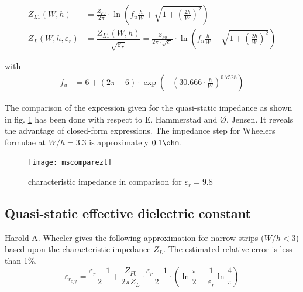 \documentclass[10pt]{report}
\begin{document}
\begin{align}
\label{eq:HandJZL0}
Z_{L1}\left(W, h\right) &=
\frac{Z_{F0}}{2\pi}\cdot\ln{\left(f_{u}\frac{h}{W} + \sqrt{1 + \left(\frac{2h}{W}\right)^{2}}\right)}\\
Z_{L}\left(W, h, \varepsilon_{r}\right) &= \dfrac{Z_{L1} \left(W, h\right)}{\sqrt{\varepsilon_{r}}} = \frac{Z_{F0}}{2\pi\cdot\sqrt{\varepsilon_{r}}}\cdot\ln{\left(f_{u}\frac{h}{W} + \sqrt{1 + \left(\frac{2h}{W}\right)^{2}}\right)}
\end{align}

with
\begin{align}
f_{u} &= 6 + \left(2\pi - 6\right)\cdot\exp{\left(-\left(30.666\cdot\frac{h}{W}\right)^{0.7528}\right)}
\end{align}

The comparison of the expression given for the quasi-static impedance
as shown in fig. \ref{fig:mscomparezl} has been done with respect to
E. Hammerstad and {\O}. Jensen.  It reveals the advantage of closed-form
expressions.  The impedance step for Wheelers formulae at $W/h = 3.3$
is approximately $0.1\ohm$.

\begin{figure}[ht]
\begin{center}
\texttt{[image: mscomparezl]}
\end{center}
\caption{characteristic impedance in comparison for $\varepsilon_{r} = 9.8$}
\label{fig:mscomparezl}
\end{figure}
\FloatBarrier

\subsection{Quasi-static effective dielectric constant}

Harold A. Wheeler \cite{Wheeler} gives the following approximation for
narrow strips ($W/h < 3$) based upon the characteristic impedance
$Z_L$.  The estimated relative error is less than 1\%.
\begin{equation}
\varepsilon_{r_{eff}} = \frac{\varepsilon_{r} + 1}{2} + \frac{Z_{F0}}{2\pi Z_{L}}\cdot \frac{\varepsilon_{r} - 1}{2}\cdot \left(\ln{\frac{\pi}{2}} + \frac{1}{\varepsilon_{r}} \ln{\frac{4}{\pi}}\right)
\end{equation}
\end{document}
